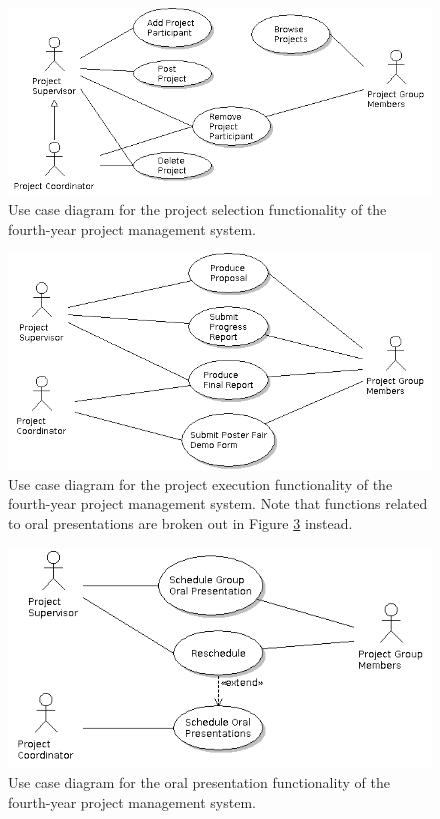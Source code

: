 \documentclass[document.tex]{subfiles}
\begin{document}
\begin{figure}[!ht]
\centering \includegraphics[width=6in]{./img/case-study-fourth-year-system/project-selection}
\caption{Use case diagram for the project selection functionality of the fourth-year project management system.}
\label{fig:case-4ys-use-case-project-selection}
\end{figure}

\begin{figure}[!ht]
\centering \includegraphics[width=6in]{./img/case-study-fourth-year-system/project-lifecycle}
\caption{Use case diagram for the project execution functionality of the fourth-year project management system. Note that functions related to oral presentations are broken out in Figure \ref{fig:case-4ys-use-case-oral-reports} instead.}
\label{fig:case-4ys-use-case-project-lifecycle}
\end{figure}

\begin{figure}[!ht]
\centering \includegraphics[width=6in]{./img/case-study-fourth-year-system/oral-report-scheduling}
\caption{Use case diagram for the oral presentation functionality of the fourth-year project management system.}
\label{fig:case-4ys-use-case-oral-reports}
\end{figure}
\end{document}
